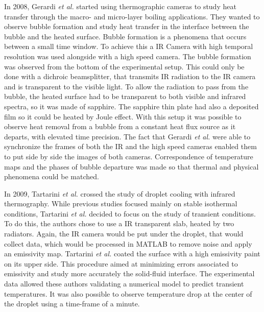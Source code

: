 \par In 2008, Gerardi \textit{et al.} \cite{Gerardi2008} started using thermographic cameras to study heat transfer through the macro- and micro-layer boiling applications. They wanted to observe bubble formation and study heat transfer in the interface between the bubble and the heated surface. Bubble formation is a phenomena that occurs between a small time window. To achieve this a IR Camera with high temporal resolution was used alongside with a high speed camera. The bubble formation was observed from the bottom of the experimental setup. This could only be done with a dichroic beamsplitter, that transmits IR radiation to the IR camera and is transparent to the visible light. To allow the radiation to pass from the bubble, the heated surface had to be transparent to both visible and infrared spectra, so it was made of sapphire. The sapphire thin plate had also a deposited film so it could be heated by Joule effect. With this setup it was possible to observe heat removal from a bubble from a constant heat flux source as it departs, with elevated time precision. The fact that Gerardi \textit{et al.} \cite{Gerardi2008} were able to synchronize the frames of both the IR and the high speed cameras enabled them to put side by side the images of both cameras. Correspondence of temperature maps and the phases of bubble departure was made so that thermal and physical phenomena could be matched. \\

\par In 2009, Tartarini \textit{et al.} \cite{tartarini2009} crossed the study of droplet cooling with infrared thermography. While previous studies focused mainly on stable isothermal conditions, Tartarini \textit{et al.} decided to focus on the study of transient conditions. To do this, the authors chose to use a IR transparent slab, heated by two radiators. Again, the IR camera would be put under the droplet, that would collect data, which would be processed in MATLAB to remove noise and apply an emissivity map. Tartarini \textit{et al.} coated the surface with a high emissivity paint on its upper side. This procedure aimed at minimizing errors associated to emissivity and study more accurately the solid-fluid interface. The experimental data allowed these authors validating a numerical model to predict transient temperatures. It was also possible to observe temperature drop at the center of the droplet using a time-frame of a minute. \\

